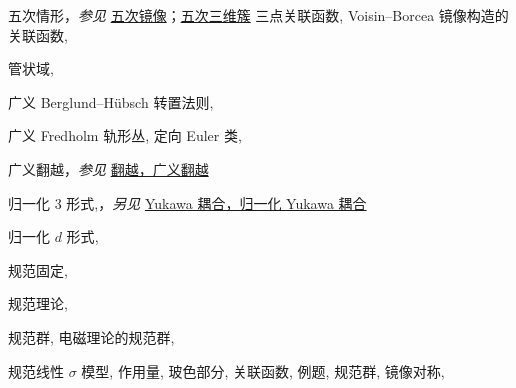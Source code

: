\begin{theindex}
\subitem \leavevmode\hypertarget{idx:0194}{五次情形}，\textit{参见} \hyperlink{idx:1164}{五次镜像}；\hyperlink{idx:1181}{五次三维簇}
\subitem \leavevmode\hypertarget{idx:0195}{三点关联函数},\enspace{}
\subitem \leavevmode\hypertarget{idx:0196}{Voisin--Borcea 镜像构造的关联函数},\enspace{}
\indexspace
\item \leavevmode\hypertarget{idx:1383}{管状域},\enspace{}
\indexspace
\item \leavevmode\hypertarget{idx:0371}{广义 Berglund--H\"ubsch 转置法则},\enspace{}
\indexspace
\item \leavevmode\hypertarget{idx:0373}{广义 Fredholm 轨形丛},\enspace{}
\subitem \leavevmode\hypertarget{idx:0374}{定向 Euler 类},\enspace{}
\indexspace
\item \leavevmode\hypertarget{idx:0372}{广义翻越}，\textit{参见} \hyperlink{idx:0334}{翻越，广义翻越}
\indexspace
\item \leavevmode\hypertarget{idx:0953}{归一化 $3$ 形式},\enspace{}，\textit{另见} \hyperlink{idx:1445}{Yukawa 耦合，归一化 Yukawa 耦合}
\indexspace
\item \leavevmode\hypertarget{idx:0954}{归一化 $d$ 形式},\enspace{}
\indexspace
\item \leavevmode\hypertarget{idx:0350}{规范固定},\enspace{}
\indexspace
\item \leavevmode\hypertarget{idx:0353}{规范理论},\enspace{}
\indexspace
\item \leavevmode\hypertarget{idx:0351}{规范群},\enspace{}
\subitem \leavevmode\hypertarget{idx:0352}{电磁理论的规范群},\enspace{}
\indexspace
\item \leavevmode\hypertarget{idx:0354}{规范线性 $\sigma$ 模型},\enspace{}
\subitem \leavevmode\hypertarget{idx:0355}{作用量},\enspace{}
\subitem \leavevmode\hypertarget{idx:0356}{玻色部分},\enspace{}
\subitem \leavevmode\hypertarget{idx:0357}{关联函数},\enspace{}
\subitem \leavevmode\hypertarget{idx:0358}{例题},\enspace{}
\subitem \leavevmode\hypertarget{idx:0359}{规范群},\enspace{}
\subitem \leavevmode\hypertarget{idx:0360}{镜像对称},\enspace{}

\end{theindex}
